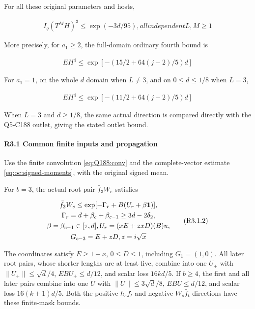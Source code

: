 For all these original parameters and hosts,

\[
\begin{gathered}
I_q(T^M H)^3\le \exp(-3d/95),all independent L,M\ge 1 
\end{gathered}\tag{R3.0.2}
\]

More precisely, for \(a_1\ge2\), the full-domain ordinary fourth bound is

\[
\begin{gathered}
EH^4\le \exp[-(15/2+64(j-2)/5)d] 
\end{gathered}\tag{R3.0.3}
\]

For \(a_1=1\), on the whole \(d\) domain when \(L\ne3\), and on \(0\le d\le1/8\) when \(L=3\),

\[
\begin{gathered}
EH^4\le \exp[-(11/2+64(j-2)/5)d] 
\end{gathered}\tag{R3.0.4}
\]

When \(L=3\) and \(d\ge1/8\), the same actual direction is compared directly with the Q5-C188 outlet, giving the stated outlet bound.



\paragraph{R3.1 Common finite inputs and propagation}

Use the finite convolution \eqref{eq:Q188:conv} and the complete-vector
estimate \eqref{eq:oc:signed-moments}, with the original signed mean.

For \(b=3\), the actual root pair \(\bar f_3W_c\) satisfies

\[
\begin{gathered}
\bar f_3W_c\le \exp[-\Gamma_r+B(U_r+\beta\mathbf1)],\\
\Gamma_r=d+\beta_c+\beta_{c-1}\ge 3d-2\delta_2,\\
\beta=\beta_{c-1} \in[\tau,d],U_r=(xE+zxD)(B)u,\\
G_{c-3}=E+zD,z=i \sqrt{x} 
\end{gathered}\tag{R3.1.2}
\]

The coordinates satisfy \(E\ge1-x\), \(0\le D\le1\), including \(G_1=(1,\allowbreak \allowbreak  0)\). All later root pairs, whose shorter lengths are at least five, combine into one \(U_+\) with \(\|U_+\|\le\sqrt d/4\), \(EBU_+\le d/12\), and scalar loss \(16kd/5\). If \(b\ge4\), the first and all later pairs combine into one \(U\) with \(\|U\|\le3\sqrt d/8\), \(EBU\le d/12\), and scalar loss \(16(k+1)d/5\). Both the positive \(h_sf_t\) and negative \(W_s\bar f_t\) directions have these finite-mask bounds.

